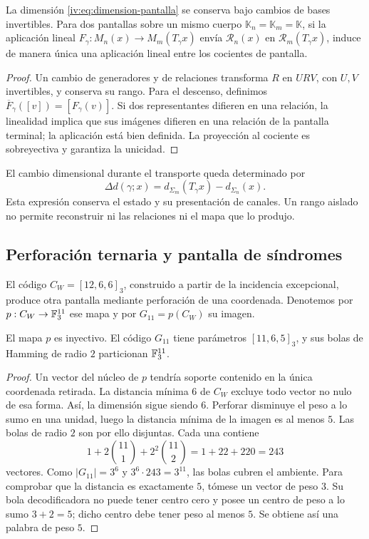 \begin{proposition}
\label{iv:prop:pantalla-transporte}
La dimensión \eqref{iv:eq:dimension-pantalla} se conserva
bajo cambios de bases invertibles. Para dos pantallas sobre un mismo cuerpo
\(\mathbb K_n=\mathbb K_m=\mathbb K\), si la aplicación lineal
\(F_\gamma:M_n(x)\to M_m(T_\gamma x)\) envía
\(\mathcal R_n(x)\) en \(\mathcal R_m(T_\gamma x)\), induce
de manera única una aplicación lineal entre los cocientes de pantalla.
\end{proposition}
\begin{proof}
Un cambio de generadores y de relaciones transforma \(R\) en
\(URV\), con \(U,V\) invertibles, y conserva su rango. Para
el descenso, definimos
\(\overline F_\gamma([v])=[F_\gamma(v)]\). Si dos
representantes difieren en una relación, la linealidad implica que sus imágenes difieren
en una relación de la pantalla terminal; la aplicación está
bien definida. La proyección al cociente es sobreyectiva y
garantiza la unicidad.
\end{proof}

El cambio dimensional durante el transporte queda determinado
por
\[
 \Delta d(\gamma;x)=d_{\Sigma_m}(T_\gamma x)
                         -d_{\Sigma_n}(x).
\]
Esta expresión conserva el estado y su presentación de canales.
Un rango aislado no permite reconstruir ni las relaciones ni
el mapa que lo produjo.

\subsection{Perforación ternaria y pantalla de síndromes}

El código \(C_W=[12,6,6]_3\), construido a partir de la
incidencia excepcional, produce otra pantalla mediante
perforación de una coordenada. Denotemos por
\(p:C_W\to\mathbb F_3^{11}\) ese mapa y por
\(G_{11}=p(C_W)\) su imagen.

\begin{proposition}
\label{iv:prop:codigo-once}
El mapa \(p\) es inyectivo. El código \(G_{11}\) tiene
parámetros \([11,6,5]_3\), y sus bolas de Hamming de radio
\(2\) particionan \(\mathbb F_3^{11}\).
\end{proposition}
\begin{proof}
Un vector del núcleo de \(p\) tendría soporte contenido en
la única coordenada retirada. La distancia mínima \(6\)
de \(C_W\) excluye todo vector no nulo de esa forma.
Así, la dimensión sigue siendo \(6\). Perforar disminuye
el peso a lo sumo en una unidad, luego la distancia mínima
de la imagen es al menos \(5\). Las bolas de radio \(2\)
son por ello disjuntas. Cada una contiene
\[
 1+2\binom{11}{1}+2^2\binom{11}{2}
 =1+22+220=243
\]
vectores. Como \(|G_{11}|=3^6\) y
\(3^6\cdot243=3^{11}\), las bolas cubren el ambiente.
Para comprobar que la distancia es exactamente \(5\),
tómese un vector de peso \(3\). Su bola decodificadora
no puede tener centro cero y posee un centro de peso a lo
sumo \(3+2=5\); dicho centro debe tener peso al menos
\(5\). Se obtiene así una palabra de peso \(5\).
\end{proof}

